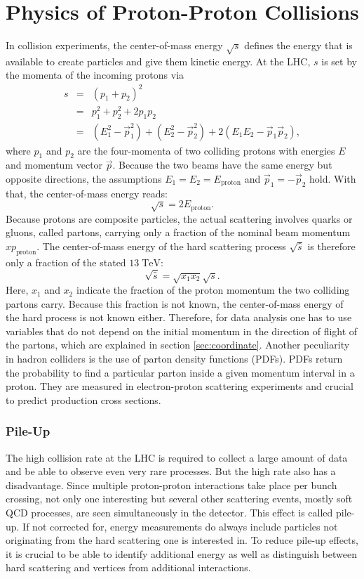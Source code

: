 \section{Physics of Proton-Proton Collisions}
	In collision experiments, the center-of-mass energy $\sqrt{s}$ defines the energy that is available to create particles and give them kinetic energy. At the LHC, $s$ is set by the momenta of the incoming protons via
	\begin{eqnarray}
	s &=& (p_1 + p_2)^2 \\
	  &=& p_1^2 + p_2^2 + 2 p_1 p_2 \\
	  &=& (E_1^2 - \vec{p}_1^2 )  + (E_2^2 - \vec{p}_2^2 ) + 2 (E_1 E_2 - \vec{p}_1 \vec{p}_2 ),
	\end{eqnarray}
	where $p_1$ and $p_2$ are the four-momenta of two colliding protons with energies $E$ and momentum vector $\vec{p}$. Because the two beams have the same energy but opposite directions, the assumptions $E_1 = E_2 = E_\text{proton}$ and $\vec{p}_1 = -\vec{p}_2$ hold. With that, the center-of-mass energy reads:
	\begin{equation}
	\sqrt{s} = 2 E_\text{proton}.
	\end{equation}
	Because protons are composite particles, the actual scattering involves quarks or gluons, called partons, carrying only a fraction of the nominal beam momentum $x p_\text{proton}$. The center-of-mass energy of the hard scattering process $\sqrt{\hat{s}}$ is therefore only a fraction of the stated $13\;\text{TeV}$:
	\begin{equation}
	\sqrt{\hat{s}} = \sqrt{x_1 x_2} \sqrt{s}.
	\end{equation} 
	Here, $x_1$ and $x_2$ indicate the fraction of the proton momentum the two colliding partons carry. Because this fraction is not known, the center-of-mass energy of the hard process is not known either. Therefore, for data analysis one has to use variables that do not depend on the initial momentum in the direction of flight of the partons, which are explained in section \ref{sec:coordinate}. Another peculiarity in hadron colliders is the use of parton density functions (PDFs). PDFs return the probability to find a particular parton inside a given momentum interval in a proton. They are measured in electron-proton scattering experiments \cite{pdf} and crucial to predict production cross sections.
		
\subsubsection{Pile-Up}
	The high collision rate at the LHC is required to collect a large amount of data and be able to observe even very rare processes. But the high rate also has a disadvantage. Since multiple proton-proton interactions take place per bunch crossing, not only one interesting but several other scattering events, mostly soft QCD processes, are seen simultaneously in the detector. This effect is called pile-up. If not corrected for, energy measurements do always include particles not originating from the hard scattering one is interested in. To reduce pile-up effects, it is crucial to be able to identify additional energy as well as distinguish between hard scattering and vertices from additional interactions.
	
